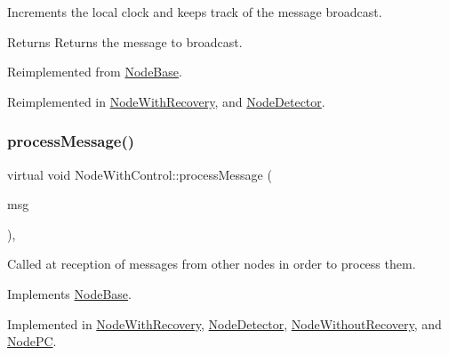 Increments the local clock and keeps track of the message broadcast. 

\begin{DoxyReturn}{Returns}
Returns the message to broadcast. 
\end{DoxyReturn}


Reimplemented from \hyperlink{class_node_base_a66c1dee9d15119bc3e68da71067ff6cd}{Node\+Base}.



Reimplemented in \hyperlink{class_node_with_recovery_a33d8e8775fd69cb647b38a54b36e1ebe}{Node\+With\+Recovery}, and \hyperlink{class_node_detector_af75cf37cc01fc51bc228a7a83c10cb97}{Node\+Detector}.

\mbox{\label{class_node_with_control_af532082fab76c38d8c50ca90e991f4c3}} 
\subsubsection{\texorpdfstring{process\+Message()}{processMessage()}}
{\footnotesize\ttfamily virtual void Node\+With\+Control\+::process\+Message (\begin{DoxyParamCaption}\item[{c\+Message $\ast$}]{msg }\end{DoxyParamCaption})\hspace{0.3cm}{\ttfamily [protected]}, {}}



Called at reception of messages from other nodes in order to process them. 



Implements \hyperlink{class_node_base_ae70b168f2bc7407c249594b1c614301c}{Node\+Base}.



Implemented in \hyperlink{class_node_with_recovery_a216c29d76ddb0e94cd5701ff208c7f5b}{Node\+With\+Recovery}, \hyperlink{class_node_detector_ab69432c6d3327a684845ec231826727e}{Node\+Detector}, \hyperlink{class_node_without_recovery_a0b44132b4ebc650399711766cb050399}{Node\+Without\+Recovery}, and \hyperlink{class_node_p_c_aa5fedc4136104a06e2f1131f1ba16b0e}{Node\+PC}.

\mbox{\label{class_node_with_control_ae177f5f64edcc09a3875e5afdc82edd2}} 
